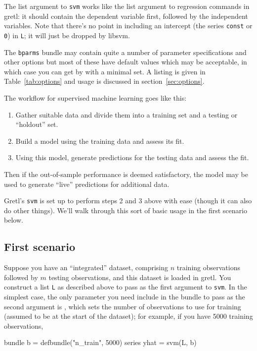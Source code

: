 \documentclass{article}
\begin{document}
The list argument to \texttt{svm} works like the list argument to
regression commands in gretl: it should contain the dependent variable
first, followed by the independent variables. Note that there's no
point in including an intercept (the series \texttt{const} or
\texttt{0}) in \texttt{L}; it will just be dropped by \textsf{libsvm}.

The \texttt{bparms} bundle may contain quite a number of parameter
specifications and other options but most of these have default
values which may be acceptable, in which case you can get by with a
minimal set.  A listing is given in Table~\ref{tab:options} and usage
is discussed in section~\ref{sec:options}.

The workflow for supervised machine learning goes like this:
\begin{enumerate}
\item Gather suitable data and divide them into a training set and a
  testing or ``holdout'' set.
\item Build a model using the training data and assess its fit.
\item Using this model, generate predictions for the testing data and
  assess the fit.
\end{enumerate}

Then if the out-of-sample performance is deemed satisfactory, the
model may be used to generate ``live'' predictions for additional
data.

Gretl's \texttt{svm} is set up to perform steps 2 and 3 above with
ease (though it can also do other things). We'll walk through this
sort of basic usage in the first scenario below.

\subsection{First scenario}
\label{sec:s1}

Suppose you have an ``integrated'' dataset, comprising $n$ training
observations followed by $m$ testing observations, and this dataset is
loaded in gretl. You construct a list \texttt{L} as described above to
pass as the first argument to \texttt{svm}. In the simplest case, the
only parameter you need include in the bundle to pass as the second
argument is , which sets the number of observations
to use for training (assumed to be at the start of the dataset); for
example, if you have 5000 training observations,
\begin{code}
bundle b = defbundle("n_train", 5000)
series yhat = svm(L, b)
\end{code}
\end{document}
